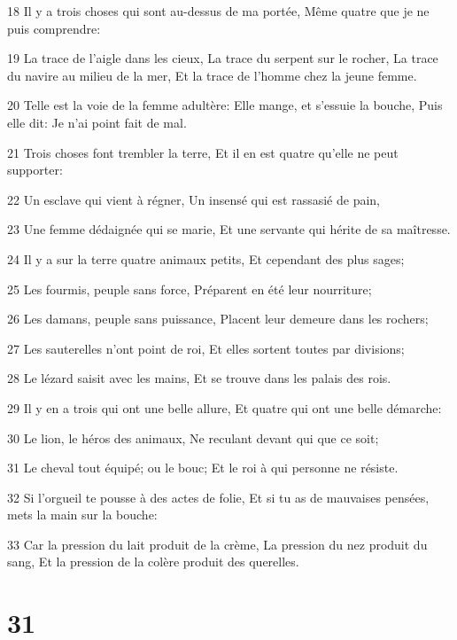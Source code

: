 \par 18 Il y a trois choses qui sont au-dessus de ma portée, Même quatre que je ne puis comprendre:
\par 19 La trace de l'aigle dans les cieux, La trace du serpent sur le rocher, La trace du navire au milieu de la mer, Et la trace de l'homme chez la jeune femme.
\par 20 Telle est la voie de la femme adultère: Elle mange, et s'essuie la bouche, Puis elle dit: Je n'ai point fait de mal.
\par 21 Trois choses font trembler la terre, Et il en est quatre qu'elle ne peut supporter:
\par 22 Un esclave qui vient à régner, Un insensé qui est rassasié de pain,
\par 23 Une femme dédaignée qui se marie, Et une servante qui hérite de sa maîtresse.
\par 24 Il y a sur la terre quatre animaux petits, Et cependant des plus sages;
\par 25 Les fourmis, peuple sans force, Préparent en été leur nourriture;
\par 26 Les damans, peuple sans puissance, Placent leur demeure dans les rochers;
\par 27 Les sauterelles n'ont point de roi, Et elles sortent toutes par divisions;
\par 28 Le lézard saisit avec les mains, Et se trouve dans les palais des rois.
\par 29 Il y en a trois qui ont une belle allure, Et quatre qui ont une belle démarche:
\par 30 Le lion, le héros des animaux, Ne reculant devant qui que ce soit;
\par 31 Le cheval tout équipé; ou le bouc; Et le roi à qui personne ne résiste.
\par 32 Si l'orgueil te pousse à des actes de folie, Et si tu as de mauvaises pensées, mets la main sur la bouche:
\par 33 Car la pression du lait produit de la crème, La pression du nez produit du sang, Et la pression de la colère produit des querelles.

\chapter{31}

